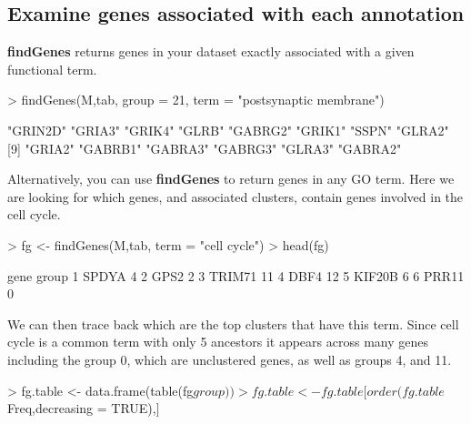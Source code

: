 \documentclass{article}
\begin{document}
\subsection*{Examine genes associated with each annotation}
\textbf{findGenes} returns genes in your dataset exactly associated with a given functional term.
\begin{Schunk}
\begin{Sinput}
> findGenes(M,tab, group = 21, term = "postsynaptic membrane")
\end{Sinput}
\begin{Soutput}
 [1] "GRIN2D" "GRIA3"  "GRIK4"  "GLRB"   "GABRG2" "GRIK1"  "SSPN"   "GLRA2" 
 [9] "GRIA2"  "GABRB1" "GABRA3" "GABRG3" "GLRA3"  "GABRA2"
\end{Soutput}
\end{Schunk}

Alternatively, you can use \textbf{findGenes} to return genes in any GO term. Here we are looking for which genes, and associated clusters, contain genes involved in the cell cycle.
\begin{Schunk}
\begin{Sinput}
> fg <- findGenes(M,tab, term = "cell cycle")
> head(fg)
\end{Sinput}
\begin{Soutput}
    gene group
1  SPDYA     4
2   GPS2     2
3 TRIM71    11
4   DBF4    12
5 KIF20B     6
6  PRR11     0
\end{Soutput}
\end{Schunk}

We can then trace back which are the top clusters that have this term. Since cell cycle is a common term with only 5 ancestors it appears across many genes including the group 0, which are unclustered genes, as well as groups 4, and 11.
\begin{Schunk}
\begin{Sinput}
> fg.table <- data.frame(table(fg$group))
> fg.table <- fg.table[order(fg.table$Freq,decreasing = TRUE),]
\end{Sinput}
\end{Schunk}
\end{document}

